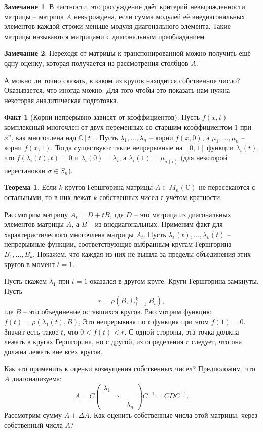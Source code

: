 \documentclass[10pt,a4paper,oneside]{book}
\theoremstyle{definition}
\newtheorem*{rem}{\color{green!50!blue}Замечание}
\newtheorem*{fact}{Факт}
\newtheorem{thm}{\color{red!40!black}Теорема}
\newcommand{\mb}[1]{\mathbb{#1}}
\def\thrm{\begin{thm}}
\def\ethrm{\end{thm}}
\def\rm{\begin{rem}}
\def\erm{\end{rem}}
\def\fct{\begin{fact}}
\def\efct{\end{fact}}
\def\pmat{\begin{pmatrix}}
\def\epmat{\end{pmatrix}}
\begin{document}
\rm В частности, это рассуждение даёт критерий невырожденности матрицы -- матрица $A$ невырождена, если сумма модулей её внедиагональных элементов каждой строки меньше модуля диагонального элемента. Такие матрицы называются матрицами с диагональным преобладанием
\erm

\rm
Переходя от матрицы к транспонированной можно получить ещё одну оценку, которая получается из рассмотрения столбцов $A$.
\erm

А можно ли точно сказать, в каком из кругов находится собственное число? Оказывается, что иногда можно. Для того чтобы это показать нам нужна некоторая аналитическая подготовка.

\fct[Корни непрерывно зависят от коэффициентов] Пусть $f(x,t)$ -- комплексный многочлен от двух переменных со старшим коэффициентом $1$ при $x^n$, как многочлена над $\mb C[t]$. Пусть $\lambda_1,\dots,\lambda_n$ -- корни $f(x,0)$, а $\mu_1,\dots, \mu_n$ -- корни $f(x,1)$. Тогда cуществуют такие непрерывные на $[0,1]$ функции $\lambda_i(t)$, что $f(\lambda_i(t),t)=0$ и $\lambda_i(0)=\lambda_i$, а $\lambda_i(1)=\mu_{\sigma(i)}$ (для некоторой перестановки $\sigma \in S_n$).
\efct

\thrm Если $k$ кругов Гершгорина матрицы $A\in M_n(\mb C)$ не пересекаются с остальными, то в них лежат $k$ собственных чисел с учётом кратности.
\ethrm
\proof Рассмотрим матрицу $A_t= D+ tB$, где $D$ -- это матрица из диагональных элементов матрицы $A$, а $B$ -- из внедиагональных. Применим факт для характеристического многочлена матрицы $A_t$. Пусть  $\lambda_1(t),\dots,\lambda_k(t)$ -- непрерывные функции, соответствующие выбранным кругам Гершгорина $B_1,\dots,B_k$. Покажем, что каждая из них не вышла за пределы объединения этих кругов в момент $t=1$. 

Пусть скажем $\lambda_1$ при $t=1$ оказался в другом круге. Круги Гершгорина замкнуты. Пусть 
$$r=\rho(B,\cup_{i=1}^k B_i),$$
где $B$ -- это объединение оставшихся кругов. Рассмотрим функцию $f(t)=\rho(\lambda_1(t),B)$,  Это непрерывная по $t$ функция при этом $f(1)=0$. Значит есть такое $t$, что $0<f(t)<r$. С одной стороны, эта точка должна лежать в кругах Гершгорина, но с другой, из определения $r$ следует, что она должна лежать вне всех кругов.  
\endproof

Как это применить к оценки возмущения собственных чисел? Предположим, что $A$ диагонализуема:
$$A=C\pmat \lambda_1 && \\ & \ddots & \\ && \lambda_n \epmat C^{-1}=CDC^{-1}.$$
Рассмотрим сумму $A+\Delta A$. Как оценить собственные числа этой матрицы, через собственный числа $A$?
\end{document}
